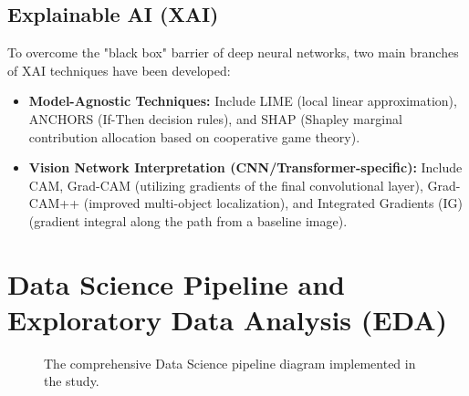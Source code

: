 \documentclass[conference]{IEEEtran}
\begin{document}
\subsection{Explainable AI (XAI)}
To overcome the "black box" barrier of deep neural networks, two main branches of XAI techniques have been developed:
\begin{itemize}
    \item \textbf{Model-Agnostic Techniques:} Include LIME \cite{b10} (local linear approximation), ANCHORS (If-Then decision rules), and SHAP \cite{b10} (Shapley marginal contribution allocation based on cooperative game theory).
    \item \textbf{Vision Network Interpretation (CNN/Transformer-specific):} Include CAM, Grad-CAM \cite{b9} (utilizing gradients of the final convolutional layer), Grad-CAM++ (improved multi-object localization), and Integrated Gradients (IG) (gradient integral along the path from a baseline image).
\end{itemize}

\section{Data Science Pipeline and Exploratory Data Analysis (EDA)}
\begin{figure}[htbp]
\centering
{}
\caption{The comprehensive Data Science pipeline diagram implemented in the study.}
\label{fig:ds_pipeline}
\end{figure}
\end{document}
